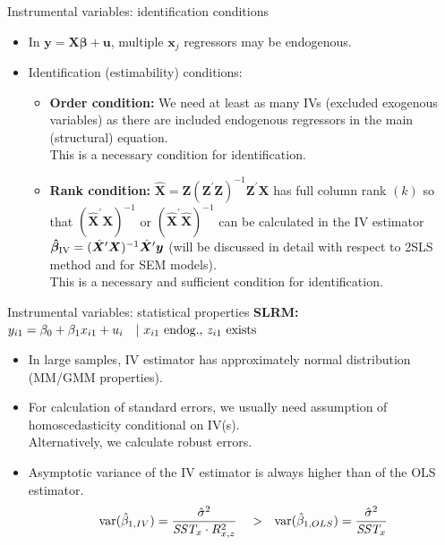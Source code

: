 \documentclass[usenames,dvipsnames]{beamer}
\begin{document}
\begin{frame}{Instrumental variables: identification conditions}
\begin{itemize} 
\item In $\bm{y} = \bm{X\beta}+\bm{u}$, multiple $\bm{x}_j$ regressors may be endogenous.
\medskip
\item Identification (estimability) conditions:
\medskip
\begin{itemize} 
\item \textbf{Order condition:} We need at least as many IVs (excluded exogenous variables) as there are included endogenous regressors in the main (structural) equation.  
\\ \medskip This is a necessary condition for identification. 
\bigskip
\item \textbf{Rank condition:} $\hat{\bm{X}} = 
\bm{Z}(\bm{Z}^{\prime}\bm{Z})^{-1} \bm{Z}^{\prime}\bm{X}$ has full column rank $(k)$ so that $(\hat{\bm{X}}^{\prime}\bm{X})^{-1}$ or $(\hat{\bm{X}}^{\prime}\hat{\bm{X}})^{-1}$ can be calculated in the IV estimator $\bm{\hat{\beta}}_{\textnormal{IV}} =  (\hat{\bm{X}}^{\prime}\bm{X})^{-1} \hat{\bm{X}}^{\prime}\bm{y}$ (will be discussed in detail with respect to 2SLS method and for SEM models).
\\ \medskip This is a necessary and sufficient condition for identification. 
\end{itemize}
\end{itemize}
\end{frame}
\begin{frame}{Instrumental variables: statistical properties}
\textbf{SLRM:} $y_{i1} = \beta_0 + \beta_1 x_{i1} + u_i \quad |~x_{i1} \textnormal{~endog.,~} z_{i1} \textnormal{~exists}$
\medskip
\begin{itemize}
\item In large samples, IV estimator has approximately normal distribution (MM/GMM properties). 
\medskip
\item For calculation of standard errors, we usually need assumption of homoscedasticity conditional on IV(s).\\ Alternatively, we calculate robust errors. 
\medskip
\item Asymptotic variance of the IV estimator is always higher than  of the OLS estimator. 
$$ \textnormal{var}(\hat{\beta}_{1,IV})=\frac{\hat{\sigma}^2}{\textit{SST}_{x} \cdot R^2_{x,z}} ~~~>~~
\textnormal{var}(\hat{\beta}_{1,OLS})=\frac{\hat{\sigma}^2}{\textit{SST}_x}$$
\end{itemize}
\end{frame}
\end{document}
